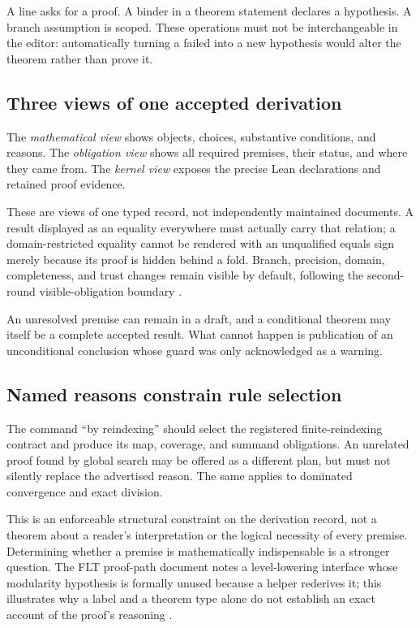 \documentclass[11pt,letterpaper]{article}
\theoremstyle{definition}\newtheorem{definition}[theorem]{Definition}
\newcommand{\code}[1]{\texttt{\detokenize{#1}}}
\begin{document}
A \code{know} line asks for a proof. A \code{given} binder in a theorem statement declares a hypothesis. A branch assumption is scoped. These operations must not be interchangeable in the editor: automatically turning a failed \code{know} into a new hypothesis would alter the theorem rather than prove it.

\subsection{Three views of one accepted derivation}
The \emph{mathematical view} shows objects, choices, substantive conditions, and reasons. The \emph{obligation view} shows all required premises, their status, and where they came from. The \emph{kernel view} exposes the precise Lean declarations and retained proof evidence.

These are views of one typed record, not independently maintained documents. A result displayed as an equality everywhere must actually carry that relation; a domain-restricted equality cannot be rendered with an unqualified equals sign merely because its proof is hidden behind a fold. Branch, precision, domain, completeness, and trust changes remain visible by default, following the second-round visible-obligation boundary \cite{reportA,reportB}.

An unresolved premise can remain in a draft, and a conditional theorem may itself be a complete accepted result. What cannot happen is publication of an unconditional conclusion whose guard was only acknowledged as a warning.

\subsection{Named reasons constrain rule selection}
The command ``by reindexing'' should select the registered finite-reindexing contract and produce its map, coverage, and summand obligations. An unrelated proof found by global search may be offered as a different plan, but must not silently replace the advertised reason. The same applies to dominated convergence and exact division.

This is an enforceable structural constraint on the derivation record, not a theorem about a reader's interpretation or the logical necessity of every premise. Determining whether a premise is mathematically indispensable is a stronger question. The FLT proof-path document notes a level-lowering interface whose modularity hypothesis is formally unused because a helper rederives it; this illustrates why a label and a theorem type alone do not establish an exact account of the proof's reasoning \cite{fltPath}.
\end{document}
